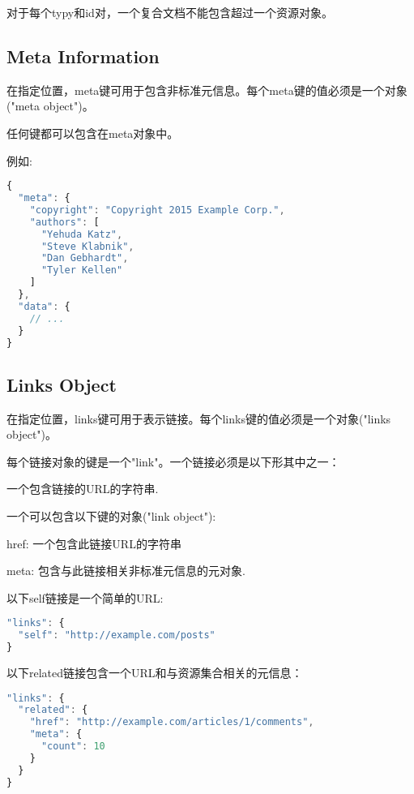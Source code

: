 对于每个typy和id对，一个复合文档不能包含超过一个资源对象。


\subsection{Meta Information}


在指定位置，meta键可用于包含非标准元信息。每个meta键的值必须是一个对象("meta object")。

任何键都可以包含在meta对象中。

例如:


\begin{lstlisting}[language=JavaScript]
{
  "meta": {
    "copyright": "Copyright 2015 Example Corp.",
    "authors": [
      "Yehuda Katz",
      "Steve Klabnik",
      "Dan Gebhardt",
      "Tyler Kellen"
    ]
  },
  "data": {
    // ...
  }
}
\end{lstlisting}


\subsection{Links Object}

在指定位置，links键可用于表示链接。每个links键的值必须是一个对象("links object")。

每个链接对象的键是一个"link"。一个链接必须是以下形其中之一：

\begin{compactitem}
\item 一个包含链接的URL的字符串.
\item 一个可以包含以下键的对象("link object"):

\begin{compactenum}
\item href: 一个包含此链接URL的字符串
\item meta: 包含与此链接相关非标准元信息的元对象.
\end{compactenum}
\end{compactitem}

以下self链接是一个简单的URL:


\begin{lstlisting}[language=JavaScript]
"links": {
  "self": "http://example.com/posts"
}
\end{lstlisting}

以下related链接包含一个URL和与资源集合相关的元信息：

\begin{lstlisting}[language=JavaScript]
"links": {
  "related": {
    "href": "http://example.com/articles/1/comments",
    "meta": {
      "count": 10
    }
  }
}
\end{lstlisting}


